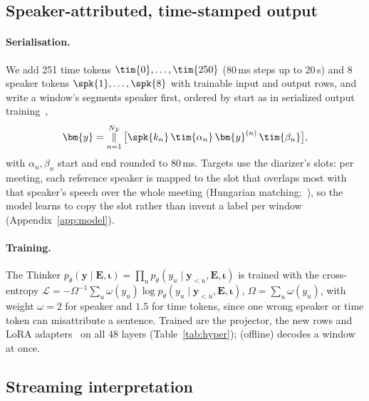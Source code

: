 \subsection{Speaker-attributed, time-stamped output}
\label{sec:method-out}
\label{sec:method-train}

\paragraph{Serialisation.} We add 251 time tokens $\tim{0},\dots,\tim{250}$ (80\,ms steps up to 20\,s) and 8 speaker
tokens $\spk{1},\dots,\spk{8}$ with trainable input and output rows, and write a window's segments speaker first,
ordered by start as in serialized output training~\citep{kanda2020sot},
\begin{equation}
\bm{y}=\mathop{\Vert}_{n=1}^{N_\mathcal{Y}}\big[\spk{k_n}\,\tim{\alpha_n}\,\bm{y}^{(n)}\,\tim{\beta_n}\big],
\label{eq:serial}
\end{equation}
with $\alpha_n,\beta_n$ start and end rounded to 80\,ms. Targets use the diarizer's slots: per meeting, each reference
speaker is mapped to the slot that overlaps most with that speaker's speech over the whole meeting (Hungarian
matching;~\citealp{kuhn1955hungarian}), so the model learns to copy the slot rather than invent a label per window
(Appendix~\ref{app:model}).

\paragraph{Training.} The Thinker $p_\theta(\bm{y}\mid\bm{E},\bm{\iota})=\prod_u p_\theta(y_u\mid\bm{y}_{<u},\bm{E},\bm{\iota})$
is trained with the cross-entropy $\mathcal{L}=-\Omega^{-1}\sum_u\omega(y_u)\log p_\theta(y_u\mid\bm{y}_{<u},\bm{E},\bm{\iota})$,
$\Omega=\sum_u\omega(y_u)$, with weight $\omega=2$ for speaker and $1.5$ for time tokens, since one wrong speaker or
time token can misattribute a sentence.
Trained are the projector, the new rows and LoRA adapters~\citep{hu2022lora} on all 48 layers (Table~\ref{tab:hyper});
\sys{} (offline) decodes a window at once.

\subsection{Streaming interpretation}
\label{sec:method-simul}


